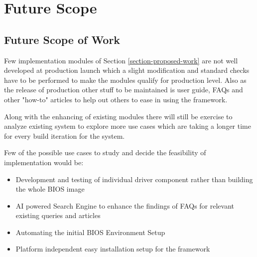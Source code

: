 \chapter{Future Scope}\label{chapter-future-scope}
\section{Future Scope of Work}\label{section-future-scope}
Few implementation modules of Section \ref{section-proposed-work} are not well developed at production launch which a slight modification and standard checks have to be performed to make the modules qualify for production level. Also as the release of production other stuff to be maintained is user guide, FAQs and other "how-to" articles to help out others to ease in using the framework.

Along with the enhancing of existing modules there will still be exercise to analyze existing system to explore more use cases which are taking a longer time for every build iteration for the system.

Few of the possible use cases to study and decide the feasibility of implementation would be:

\begin{itemize}
	\item Development and testing of individual driver component rather than building the whole BIOS image
	\item AI powered Search Engine to enhance the findings of FAQs for relevant existing queries and articles
	\item Automating the initial BIOS Environment Setup
	\item Platform independent easy installation setup for the framework
\end{itemize}

